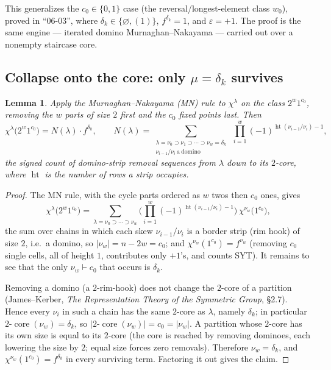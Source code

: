 \documentclass[11pt]{article}
\newtheorem{lemma}{Lemma}
\theoremstyle{definition}
\DeclareMathOperator{\core}{core}
\DeclareMathOperator{\hght}{ht}
\newcommand{\la}{\lambda}
\begin{document}
This generalizes the $c_0\in\{0,1\}$ case (the reversal/longest-element class
$w_0$), proved in ``06-03'', where $\delta_k\in\{\varnothing,(1)\}$,
$f^{\delta_k}=1$, and $\varepsilon=+1$. The proof is the same engine --- iterated
domino Murnaghan--Nakayama --- carried out over a nonempty staircase core.

\subsection{Collapse onto the core: only $\mu=\delta_k$ survives}

\begin{lemma}\label{lem:collapse}
Apply the Murnaghan--Nakayama (MN) rule to $\chi^\la$ on the class
$2^{w}1^{c_0}$, removing the $w$ parts of size $2$ first and the $c_0$ fixed
points last. Then
\[
  \chi^\la\!\big(2^{w}1^{c_0}\big)=N(\la)\cdot f^{\delta_k},
  \qquad
  N(\la)=\sum_{\substack{\la=\nu_0\supset\nu_1\supset\cdots\supset\nu_w=\delta_k\\
                          \nu_{i-1}/\nu_i\ \mathrm{a\ domino}}}
         \ \prod_{i=1}^{w}(-1)^{\hght(\nu_{i-1}/\nu_i)-1},
\]
the signed count of domino-strip removal sequences from $\la$ down to its
$2$-core, where $\hght$ is the number of rows a strip occupies.
\end{lemma}

\begin{proof}
The MN rule, with the cycle parts ordered as $w$ twos then $c_0$ ones, gives
\[
  \chi^\la\!\big(2^{w}1^{c_0}\big)
  =\sum_{\la=\nu_0\supset\cdots\supset\nu_w}
    \Big(\prod_{i=1}^w(-1)^{\hght(\nu_{i-1}/\nu_i)-1}\Big)\,
    \chi^{\nu_w}\!\big(1^{c_0}\big),
\]
the sum over chains in which each skew $\nu_{i-1}/\nu_i$ is a border strip
(rim hook) of size $2$, i.e.\ a domino, so $|\nu_w|=n-2w=c_0$; and
$\chi^{\nu_w}(1^{c_0})=f^{\nu_w}$ (removing $c_0$ single cells, all of height
$1$, contributes only $+1$'s, and counts SYT). It remains to see that the only
$\nu_w\vdash c_0$ that occurs is $\delta_k$.

Removing a domino (a $2$-rim-hook) does not change the $2$-core of a partition
(James--Kerber, \emph{The Representation Theory of the Symmetric Group}, \S2.7).
Hence every $\nu_i$ in such a chain has the same $2$-core as $\la$, namely
$\delta_k$; in particular $2\text{-}\core(\nu_w)=\delta_k$, so
$|2\text{-}\core(\nu_w)|=c_0=|\nu_w|$. A partition whose $2$-core has its own
size is equal to its $2$-core (the core is reached by removing dominoes, each
lowering the size by $2$; equal size forces zero removals). Therefore
$\nu_w=\delta_k$, and $\chi^{\nu_w}(1^{c_0})=f^{\delta_k}$ in every surviving
term. Factoring it out gives the claim.
\end{proof}
\end{document}
